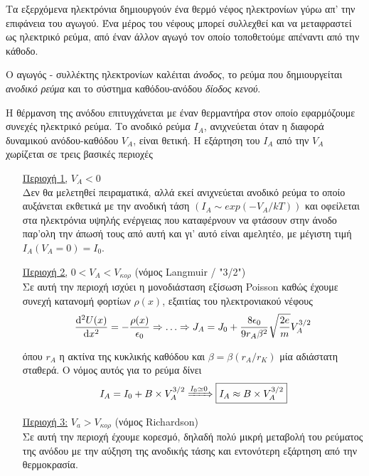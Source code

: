 \documentclass[a4paper]{article}
\begin{document}
Τα εξερχόμενα ηλεκτρόνια δημιουργούν ένα θερμό νέφος ηλεκτρονίων γύρω απ' την επιφάνεια του αγωγού. Ένα μέρος του νέφους μπορεί συλλεχθεί και να μεταφραστεί ως ηλεκτρικό ρεύμα, από έναν άλλον αγωγό τον οποίο τοποθετούμε απέναντι από την κάθοδο. 

Ο αγωγός - συλλέκτης ηλεκτρονίων καλέιται \textit{άνοδος}, το ρεύμα που δημιουργείται \textit{ανοδικό ρεύμα} και το σύστημα καθόδου-ανόδου \textit{δίοδος κενού}.

Η θέρμανση της ανόδου επιτυγχάνεται με έναν θερμαντήρα στον οποίο εφαρμόζουμε συνεχές ηλεκτρικό ρεύμα. Το ανοδικό ρεύμα $I_A$, ανιχνεύεται όταν η διαφορά δυναμικού ανόδου-καθόδου $V_A$, είναι θετική. Η εξάρτηση του $I_A$ από την $V_A$ χωρίζεται σε τρεις βασικές περιοχές


\begin{itemize}
\item[\underline{Περιοχή 1,}]\textit{$V_A<0 $} \\ 
Δεν θα μελετηθεί πειραματικά, αλλά εκεί ανιχνεύεται ανοδικό ρεύμα το οποίο αυξάνεται εκθετικά με την ανοδική τάση $(I_A\sim exp(-V_A/kT))$ και οφείλεται στα ηλεκτρόνια υψηλής ενέργειας που καταφέρνουν να φτάσουν στην άνοδο παρ'ολη την άπωσή τους από αυτή και γι' αυτό είναι αμελητέο, με μέγιστη τιμή $I_A(V_A=0)=I_0$.

\item[\underline{Περιοχή 2,}]\textit{$0<V_A<V_{κορ} $} (νόμος Langmuir / "3/2") \\ 
Σε αυτή την περιοχή ισχύει η μονοδιάσταση εξίσωση Poisson καθώς έχουμε συνεχή κατανομή φορτίων $\rho(x)$, εξαιτίας του ηλεκτρονιακού νέφους 
\begin{equation*}
\odv[2]{U(x)}{x}= -\frac{\rho(x)}{\epsilon_0}\Rightarrow \hdots \Rightarrow J_A = J_0+ \frac{8\epsilon_0}{9r_A\beta^2}\sqrt{\frac{2e}{m}}V_A^{3/2}  
\end{equation*}

όπου $r_A$ η ακτίνα της κυκλικής καθόδου και $\beta=\beta(r_A/r_K)$ μία αδιάστατη σταθερά.
Ο νόμος αυτός για το ρεύμα δίνει 
\begin{equation}\label{4}
I_A = I_0 + B\times V_A^{3/2} \xRightarrow{I_0\simeq0} \boxed{I_A \approx B\times V_A^{3/2}}
\end{equation}

\item[\underline{Περιοχή 3:}]\textit{$V_a>V_{κορ}$} (νόμος Richardson) \\
	Σε αυτή την περιοχή έχουμε κορεσμό, δηλαδή πολύ μικρή μεταβολή του ρεύματος της ανόδου με την αύξηση της ανοδικής τάσης και εντονότερη εξάρτηση από την θερμοκρασία.
	

\end{itemize}
\end{document}
